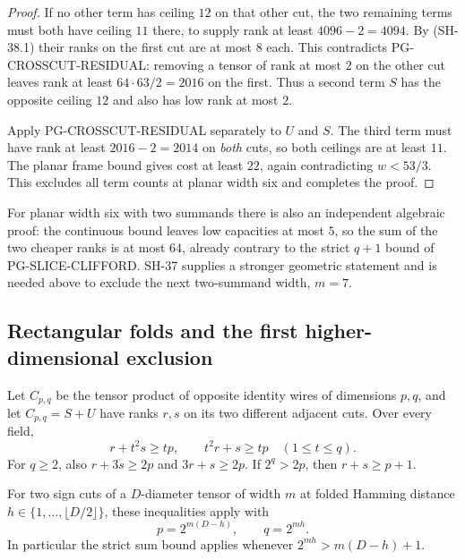 \begin{proof}
If no other term has ceiling $12$ on that other cut,
the two remaining terms must both have ceiling $11$
there, to supply rank at least $4096-2=4094$.
By (SH-38.1) their ranks on the first cut are at most
$8$ each.  This contradicts PG-CROSSCUT-RESIDUAL:
removing a tensor of rank at most $2$ on the other cut
leaves rank at least $64\cdot63/2=2016$ on the first.
Thus a second term $S$ has the opposite ceiling $12$
and also has low rank at most $2$.

Apply PG-CROSSCUT-RESIDUAL separately to $U$ and $S$.
The third term must have rank at least $2016-2=2014$
on \emph{both} cuts, so both ceilings are at least $11$.
The planar frame bound gives cost at least $22$, again
contradicting $w<53/3$.  This excludes all term counts
at planar width six and completes the proof.
\end{proof}

For planar width six with two summands there is also an
independent algebraic proof: the continuous bound leaves
low capacities at most $5$, so the sum of the two cheaper
ranks is at most $64$, already contrary to the strict
$q+1$ bound of PG-SLICE-CLIFFORD.  SH-37 supplies a
stronger geometric statement and is needed above to
exclude the next two-summand width, $m=7$.

\subsection{Rectangular folds and the first higher-dimensional exclusion}

\begin{lemma}
\label{lem:rectangular-fold-constraints}
Let $C_{p,q}$ be the tensor product of opposite identity wires
of dimensions $p,q$, and let $C_{p,q}=S+U$ have ranks $r,s$
on its two different adjacent cuts.  Over every field,
\[
 r+t^2s\ge tp,\qquad t^2r+s\ge tp
       \quad(1\le t\le q).                          \tag{SH-39.1}
\]
For $q\ge2$, also $r+3s\ge2p$ and $3r+s\ge2p$.
If $2^q>2p$, then $r+s\ge p+1$.

For two sign cuts of a $D$-diameter tensor of width $m$ at
folded Hamming distance $h\in\{1,\ldots,\lfloor D/2\rfloor\}$,
these inequalities apply with
\[
 p=2^{m(D-h)},\qquad q=2^{mh}.                        \tag{SH-39.2}
\]
In particular the strict sum bound applies whenever
$2^{mh}>m(D-h)+1$.
\end{lemma}

